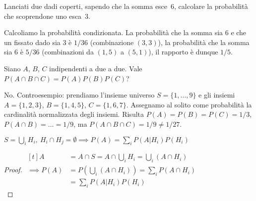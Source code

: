 
\begin{ex}
	Lanciati due dadi coperti, sapendo che la somma esce~6, calcolare la probabilità che scoprendone uno esca~3.
\end{ex}

\begin{solution}
	Calcoliamo la probabilità condizionata. La probabilità che la somma sia 6 e che un fissato dado sia 3 è $1/36$ (combinazione $(3,3)$), la probabilità che la somma sia 6 è $5/36$ (combinazioni da $(1,5)$ a $(5,1)$), il rapporto è dunque $1/5$.
\end{solution}

\begin{ex}
	Siano $A$, $B$, $C$ indipendenti a due a due. Vale $P(A\cap B\cap C)=P(A)P(B)P(C)$?
\end{ex}

\begin{solution}
	No. Controesempio: prendiamo l'insieme universo
	$S = \{1,\dots,9\}$
	e gli insiemi
	$A = \{1, 2, 3\}$,
	$B = \{1, 4, 5\}$,
	$C = \{1, 6, 7\}$.
	Assegnamo al solito come probabilità la cardinalità normalizzata degli insiemi.
	Risulta $P(A)=P(B)=P(C)=1/3$, $P(A\cap B)=\dots=1/9$, ma $P(A\cap B\cap C)=1/9\neq1/27$.
\end{solution}

\begin{teo}
	$S=\bigcup_iH_i,\ H_i\cap H_j=\emptyset\implies P(A)=\sum_iP(A|H_i)P(H_i)$
\end{teo}

\begin{proof}
	$\begin{aligned}[t]
		A &= A\cap S = A\cap \bigcup_iH_i = \bigcup_i(A\cap H_i) \\
		\implies P(A) &= P\left(\bigcup_i(A\cap H_i)\right) = \sum_i P(A\cap H_i) \\
		&= \sum_i P(A|H_i)P(H_i)
	\end{aligned}$\vspace{-1em}\\
\end{proof}
